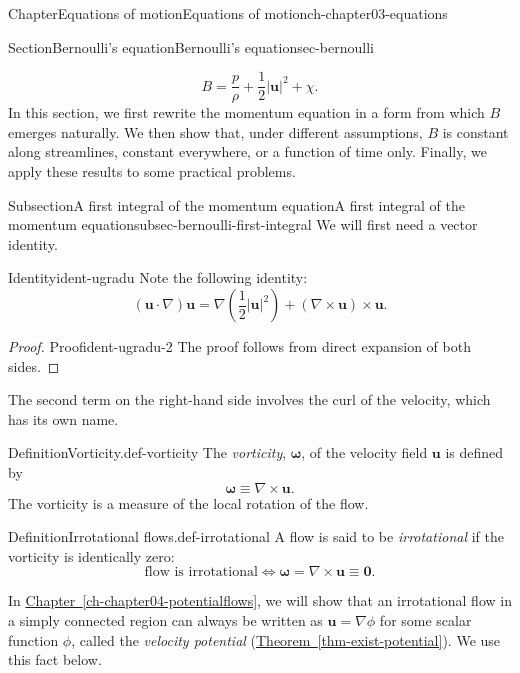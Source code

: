 \documentclass[oneside,10pt,]{book}
\newcommand{\xreffont}{\relax}
\numberwithin{equation}{section}
\newcommand{\bu}{\boldsymbol{u}}
\newcommand{\bomega}{\boldsymbol{\omega}}
\begin{document}
\begin{chapterptx}{Chapter}{Equations of motion}{}{Equations of motion}{}{}{ch-chapter03-equations}
\begin{sectionptx}{Section}{Bernoulli's equation}{}{Bernoulli's equation}{}{}{sec-bernoulli}
\begin{introduction}{}
\begin{equation*}
B = \frac{p}{\rho} + \frac{1}{2}|\bu|^2 + \chi.
\end{equation*}
In this section, we first rewrite the momentum equation in a form from which \(B\) emerges naturally. We then show that, under different assumptions, \(B\) is constant along streamlines, constant everywhere, or a function of time only. Finally, we apply these results to some practical problems.%
\end{introduction}%
%
%
\typeout{************************************************}
\typeout{************************************************}
%
\begin{subsectionptx}{Subsection}{A first integral of the momentum equation}{}{A first integral of the momentum equation}{}{}{subsec-bernoulli-first-integral}
We will first need a vector identity.%
\begin{identity}{Identity}{}{}{ident-ugradu}%
Note the following identity:%
\begin{equation}
(\bu \cdot \nabla) \bu = \nabla \left(\frac{1}{2}|\bu|^2\right) + (\nabla \times \bu)
\times \bu.\label{eqn-ugradu}
\end{equation}
%
\end{identity}
\begin{proof}{Proof}{}{ident-ugradu-2}
The proof follows from direct expansion of both sides.%
\end{proof}
The second term on the right-hand side involves the curl of the velocity, which has its own name.%
\begin{definition}{Definition}{Vorticity.}{}{def-vorticity}%
The \emph{vorticity}, \(\bomega\), of the velocity field \(\bu\) is defined by%
\begin{equation}
\bomega \equiv \nabla \times \bu.\label{eqn-vorticity}
\end{equation}
The vorticity is a measure of the local rotation of the flow.%
\end{definition}
\begin{definition}{Definition}{Irrotational flows.}{}{def-irrotational}%
A flow is said to be \emph{irrotational} if the vorticity is identically zero:%
\begin{equation}
\textrm{flow is irrotational} \Longleftrightarrow \bomega = \nabla \times \bu \equiv
\mathbf{0}.\label{eqn-irrotational}
\end{equation}
%
\end{definition}
In \hyperref[ch-chapter04-potentialflows]{Chapter~{\xreffont\ref{ch-chapter04-potentialflows}}}, we will show that an irrotational flow in a simply connected region can always be written as \(\bu = \nabla\phi\) for some scalar function \(\phi\), called the \emph{velocity potential} (\hyperref[thm-exist-potential]{Theorem~{\xreffont\ref{thm-exist-potential}}}). We use this fact below.%

\end{subsectionptx}
\end{sectionptx}
\end{chapterptx}
\end{document}
